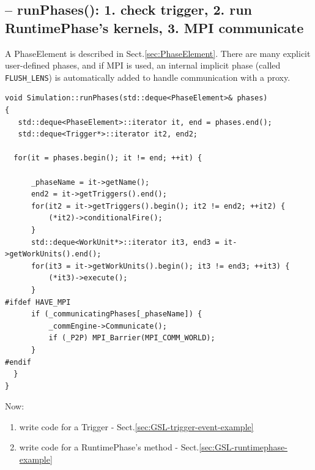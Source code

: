 \subsection{-- runPhases(): 1. check trigger, 2. run RuntimePhase's kernels, 3.
MPI communicate}
\label{sec:GSL-runPhases()}
\label{sec:Simulation-runPhases()}

A PhaseElement is described in Sect.\ref{sec:PhaseElement}.
There are many explicit user-defined phases, and if MPI is used, an internal
implicit phase (called \verb!FLUSH_LENS!) is automatically added to handle
communication with a proxy.

\begin{verbatim}
void Simulation::runPhases(std::deque<PhaseElement>& phases)
{
   std::deque<PhaseElement>::iterator it, end = phases.end();
   std::deque<Trigger*>::iterator it2, end2;

  for(it = phases.begin(); it != end; ++it) {

	  _phaseName = it->getName(); 
	  end2 = it->getTriggers().end();
	  for(it2 = it->getTriggers().begin(); it2 != end2; ++it2) {
		  (*it2)->conditionalFire();
	  }
	  std::deque<WorkUnit*>::iterator it3, end3 = it->getWorkUnits().end();
	  for(it3 = it->getWorkUnits().begin(); it3 != end3; ++it3) {
		  (*it3)->execute();
	  }
#ifdef HAVE_MPI
	  if (_communicatingPhases[_phaseName]) {
		  _commEngine->Communicate();
		  if (_P2P) MPI_Barrier(MPI_COMM_WORLD);
	  }
#endif
  }
}
\end{verbatim}

Now:
\begin{enumerate}
  \item write code for a Trigger - Sect.\ref{sec:GSL-trigger-event-example}
  \item write code for a RuntimePhase's method -
  Sect.\ref{sec:GSL-runtimephase-example}
\end{enumerate}

